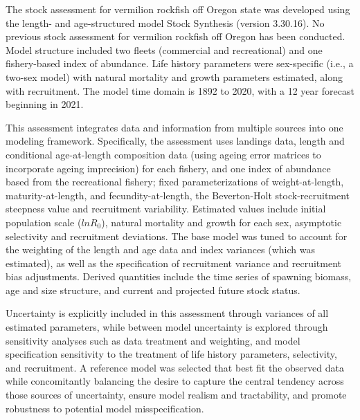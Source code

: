\documentclass[11pt,
  english,
  a4paper,
]{article}
\begin{document}

The stock assessment for vermilion rockfish off Oregon state was developed using the length- and age-structured model Stock Synthesis (version 3.30.16). No previous stock assessment for vermilion rockfish off Oregon has been conducted. Model structure included two fleets (commercial and recreational) and one fishery-based index of abundance. Life history parameters were sex-specific (i.e., a two-sex model) with natural mortality and growth parameters estimated, along with recruitment. The model time domain is 1892 to 2020, with a 12 year forecast beginning in 2021.

\leavevmode\tagmcend\tagstructend\par


This assessment integrates data and information from multiple sources into one modeling framework. Specifically, the assessment uses landings data, length and conditional age-at-length composition data (using ageing error matrices to incorporate ageing imprecision) for each fishery, and one index of abundance based from the recreational fishery; fixed parameterizations of weight-at-length, maturity-at-length, and fecundity-at-length, the Beverton-Holt stock-recruitment steepness value and recruitment variability. Estimated values include initial population scale ({\(lnR_0\)\leavevmode\tagmcend\tagstructend}), natural mortality and growth for each sex, asymptotic selectivity and recruitment deviations. The base model was tuned to account for the weighting of the length and age data and index variances (which was estimated), as well as the specification of recruitment variance and recruitment bias adjustments. Derived quantities include the time series of spawning biomass, age and size structure, and current and projected future stock status.

\leavevmode\tagmcend\tagstructend\par


Uncertainty is explicitly included in this assessment through variances of all estimated parameters, while between model uncertainty is explored through sensitivity analyses such as data treatment and weighting, and model specification sensitivity to the treatment of life history parameters, selectivity, and recruitment. A reference model was selected that best fit the observed data while concomitantly balancing the desire to capture the central tendency across those sources of uncertainty, ensure model realism and tractability, and promote robustness to potential model misspecification.
\end{document}
